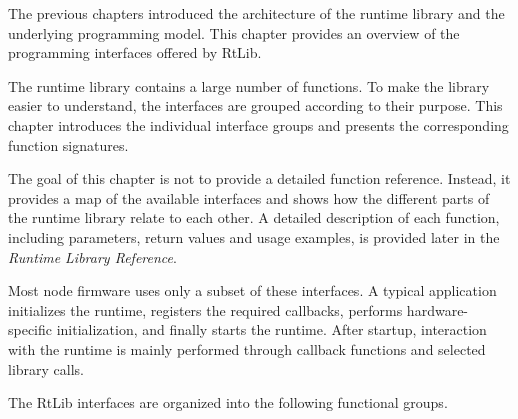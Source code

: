 %

The previous chapters introduced the architecture of the runtime library and the
underlying programming model. This chapter provides an overview of the programming 
interfaces offered by RtLib.

The runtime library contains a large number of functions. To make the library easier 
to understand, the interfaces are grouped according to their purpose. This chapter 
introduces the individual interface groups and presents the corresponding function 
signatures.

The goal of this chapter is not to provide a detailed function reference. Instead, 
it provides a map of the available interfaces and shows how the different parts of 
the runtime library relate to each other. A detailed description of each function, 
including parameters, return values and usage examples, is provided later in 
the \textit{Runtime Library Reference}.

Most node firmware uses only a subset of these interfaces. A typical application 
initializes the runtime, registers the required callbacks, performs 
hardware-specific initialization, and finally starts the runtime. After startup, 
interaction with the runtime is mainly performed through callback functions and 
selected library calls.


The RtLib interfaces are organized into the following functional groups.

